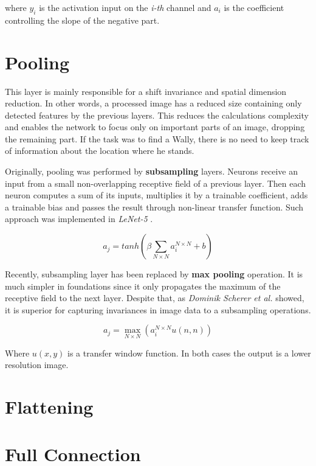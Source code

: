 where $y_i$ is the activation input on the \emph{i-th} channel and $a_i$ is the coefficient controlling the slope of the negative part. 

\section{Pooling}
\label{sec:conv-pooling}

This layer is mainly responsible for a shift invariance and spatial dimension reduction. In other words, a processed image has a reduced size containing only detected features by the previous layers. This reduces the calculations complexity and enables the network to focus only on important parts of an image, dropping the remaining part. If the task was to find a Wally, there is no need to keep track of information about the location where he stands.

Originally, pooling was performed by \textbf{subsampling} layers. Neurons receive an input from a small non-overlapping receptive field of a previous layer. Then each neuron computes a sum of its inputs, multiplies it by a trainable coefficient, adds a trainable bias and passes the result through non-linear transfer function. Such approach was implemented in \emph{LeNet-5} \cite{GradientBasedLearningDigitRec}.

\begin{equation}
    a_j = tanh\left(\beta \sum_{N \times N} a_i^{N \times N} + b \right)
\end{equation}

Recently, subsampling layer has been replaced by \textbf{max pooling} operation. It is much simpler in foundations since it only propagates the maximum of the receptive field to the next layer. Despite that, as \emph{Dominik Scherer et al.} \cite{MaxPool} showed, it is superior for capturing invariances in image data to a subsampling operations.

\begin{equation}
    a_j = \max_{N \times N} \left( a_i^{N \times N} u(n, n) \right)
\end{equation}

Where $u(x, y)$ is a transfer window function. In both cases the output is a lower resolution image.

\section{Flattening}
\label{sec:flattening}

\section{Full Connection}
\label{sec:full-conn}